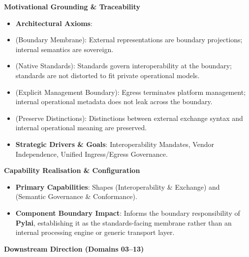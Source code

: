 \par\medskip\textbf{Motivational Grounding \& Traceability}\par


\begin{itemize}


\item \textbf{Architectural Axioms}:

\item \texttt{} (Boundary Membrane): External representations are boundary projections; internal semantics are sovereign.

\item \texttt{} (Native Standards): Standards govern interoperability at the boundary; standards are not distorted to fit private operational models.

\item \texttt{} (Explicit Management Boundary): Egress terminates platform management; internal operational metadata does not leak across the boundary.

\item \texttt{} (Preserve Distinctions): Distinctions between external exchange syntax and internal operational meaning are preserved.

\item \textbf{Strategic Drivers \& Goals}: Interoperability Mandates, Vendor Independence, Unified Ingress/Egress Governance.

\end{itemize}


\par\medskip\textbf{Capability Realisation \& Configuration}\par


\begin{itemize}


\item \textbf{Primary Capabilities}: Shapes \texttt{} (Interoperability \& Exchange) and \texttt{} (Semantic Governance \& Conformance).

\item \textbf{Component Boundary Impact}: Informs the boundary responsibility of \textbf{Pylai}, establishing it as the standards-facing membrane rather than an internal processing engine or generic transport layer.

\end{itemize}


\par\medskip\textbf{Downstream Direction (Domains 03–13)}\par


